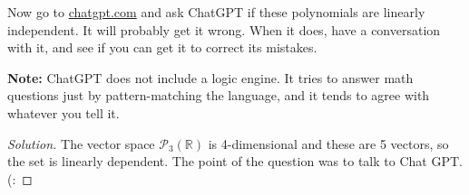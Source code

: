 \documentclass[a4paper,11pt]{article}
\theoremstyle{definition}
\newenvironment{solution}
  {\renewcommand\qedsymbol{$\blacksquare$}\begin{proof}[Solution]}
  {\end{proof}}
\begin{document}
\begin{enumerate}[(1)]
Now go to \href{https://chat.openai.com/}{chatgpt.com} and ask ChatGPT if these polynomials are linearly independent.
It will probably get it wrong.
When it does, have a conversation with it, and see if you can get it to correct its mistakes.

\noindent
\textbf{Note:}
ChatGPT does not include a logic engine. It tries to answer math questions just by
pattern-matching the language, and it tends to agree with whatever you tell it.
\begin{solution}
The vector space $\mathcal P_3(\mathbb R)$ is 4-dimensional and these are 5 vectors, so the set is linearly dependent.
The point of the question was to talk to Chat GPT. (:
\end{solution}
\end{enumerate}
\end{document}
